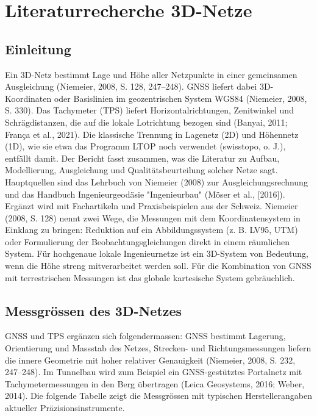 \section{Literaturrecherche 3D-Netze}
\label{sec:literaturrecherche 3D-Netze}

\subsection{Einleitung}
Ein 3D-Netz bestimmt Lage und Höhe aller Netzpunkte in einer gemeinsamen Ausgleichung (Niemeier, 2008, S. 128, 247–248). 
GNSS liefert dabei 3D-Koordinaten oder Basislinien im geozentrischen System WGS84 (Niemeier, 2008, S. 330). 
Das Tachymeter (TPS) liefert Horizontalrichtungen, Zenitwinkel und Schrägdistanzen, die auf die lokale Lotrichtung bezogen sind (Banyai, 2011; França et al., 2021).
Die klassische Trennung in Lagenetz (2D) und Höhennetz (1D), wie sie etwa das Programm LTOP noch verwendet (swisstopo, o. J.), entfällt damit.
Der Bericht fasst zusammen, was die Literatur zu Aufbau, Modellierung, Ausgleichung und Qualitätsbeurteilung solcher Netze sagt. Hauptquellen sind das Lehrbuch von Niemeier (2008) zur Ausgleichungsrechnung und das Handbuch Ingenieurgeodäsie "Ingenieurbau" (Möser et al., [2016]).
Ergänzt wird mit Fachartikeln und Praxisbeispielen aus der Schweiz.
Niemeier (2008, S. 128) nennt zwei Wege, die Messungen mit dem Koordinatensystem in Einklang zu bringen: Reduktion auf ein Abbildungssystem (z. B. LV95, UTM) oder Formulierung der Beobachtungsgleichungen direkt in einem räumlichen System. 
Für hochgenaue lokale Ingenieurnetze ist ein 3D-System von Bedeutung, wenn die Höhe streng mitverarbeitet werden soll. Für die Kombination von GNSS mit terrestrischen Messungen ist das globale kartesische System gebräuchlich.

\subsection{Messgrössen des 3D-Netzes}
\label{sec:Messgrössen des 3D-Netzes}
GNSS und TPS ergänzen sich folgendermassen: GNSS bestimmt Lagerung, Orientierung und Massstab des Netzes, Strecken- und Richtungsmessungen liefern die innere Geometrie mit hoher relativer Genauigkeit (Niemeier, 2008, S. 232, 247–248). 
Im Tunnelbau wird zum Beispiel ein GNSS-gestütztes Portalnetz mit Tachymetermessungen in den Berg übertragen (Leica Geosystems, 2016; Weber, 2014). 
Die folgende Tabelle zeigt die Messgrössen mit typischen Herstellerangaben aktueller Präzisionsinstrumente.

